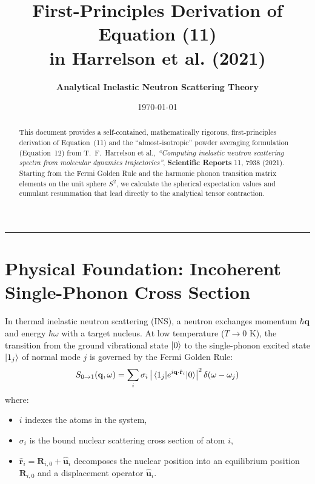 \documentclass[11pt,a4paper]{article}
\title{\textbf{First-Principles Derivation of Equation (11) \\ in Harrelson et al. (2021)}}
\author{\textbf{Analytical Inelastic Neutron Scattering Theory}}
\date{\today}
\begin{document}
\maketitle

\begin{abstract}
This document provides a self-contained, mathematically rigorous, first-principles derivation of Equation~(11) and the ``almost-isotropic'' powder averaging formulation (Equation~12) from T.~F.~Harrelson et al., \emph{``Computing inelastic neutron scattering spectra from molecular dynamics trajectories''}, \textbf{Scientific Reports} 11, 7938 (2021). Starting from the Fermi Golden Rule and the harmonic phonon transition matrix elements on the unit sphere $S^2$, we calculate the spherical expectation values and cumulant resummation that lead directly to the analytical tensor contraction.
\end{abstract}

\vspace{1em}
\hrule
\vspace{1.5em}

\section{Physical Foundation: Incoherent Single-Phonon Cross Section}

In thermal inelastic neutron scattering (INS), a neutron exchanges momentum $\hbar \mathbf{q}$ and energy $\hbar \omega$ with a target nucleus. At low temperature ($T \to 0\text{ K}$), the transition from the ground vibrational state $\ket{0}$ to the single-phonon excited state $\ket{1_j}$ of normal mode $j$ is governed by the Fermi Golden Rule:
\begin{equation}
S_{0 \to 1}(\mathbf{q}, \omega) = \sum_i \sigma_i \left| \mel{1_j}{e^{i \mathbf{q} \cdot \hat{\mathbf{r}}_i}}{0} \right|^2 \delta(\omega - \omega_j)
\end{equation}
where:
\begin{itemize}
    \item $i$ indexes the atoms in the system,
    \item $\sigma_i$ is the bound nuclear scattering cross section of atom $i$,
    \item $\hat{\mathbf{r}}_i = \mathbf{R}_{i,0} + \hat{\mathbf{u}}_i$ decomposes the nuclear position into an equilibrium position $\mathbf{R}_{i,0}$ and a displacement operator $\hat{\mathbf{u}}_i$.
\end{itemize}
\end{document}
